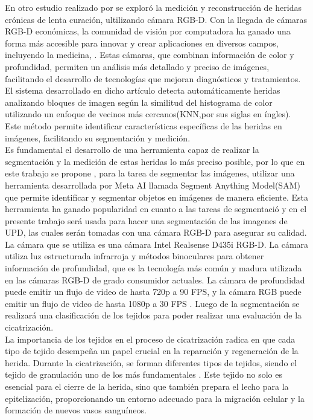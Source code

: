 \documentclass[12pt]{article}
\begin{document}
	En otro estudio realizado por \cite{Filko2018} se explor\'o la medici\'on y reconstrucci\'on de heridas cr\'onicas de lenta curaci\'on, ultilizando c\'amara RGB-D. Con la llegada de cámaras RGB-D económicas, la comunidad de visión por computadora ha ganado una forma más accesible para innovar y crear aplicaciones en diversos campos, incluyendo la medicina, \cite{Filko2018}. Estas cámaras, que combinan información de color y profundidad, permiten un análisis más detallado y preciso de imágenes, facilitando el desarrollo de tecnologías que mejoran diagnósticos y tratamientos. El sistema desarrollado en dicho art\'iculo detecta automáticamente heridas analizando bloques de imagen según la similitud del histograma de color utilizando un enfoque de vecinos más cercanos(KNN,por sus siglas en \'ingles). Este método permite identificar características específicas de las heridas en imágenes, facilitando su segmentación y medición.
	\\
	
	Es fundamental el desarrollo de una herramienta capaz de realizar la segmentaci\'on y la medici\'on de estas heridas lo m\'as preciso posible, por lo que en este trabajo se propone , para la tarea de segmentar las im\'agenes,  utilizar una herramienta desarrollada por Meta AI llamada Segment Anything Model(SAM)\parencite{segmentanything2023} que permite identificar y segmentar objetos en imágenes de manera eficiente. Esta herramienta ha ganado popularidad en cuanto a las tareas de segmentaci\'o y en el presente trabajo ser\'a usada para hacer una segmentaci\'on de las imagenes de UPD, las cuales ser\'an tomadas con una c\'amara RGB-D para asegurar su calidad.
	\\
	
	 La c\'amara que se utiliza es una c\'amara Intel Realsense D435i RGB-D. La cámara utiliza luz estructurada infrarroja y métodos binoculares para obtener información de profundidad, que es la tecnología más común y madura utilizada en las cámaras RGB-D de grado consumidor actuales. La cámara de profundidad puede emitir un flujo de video de hasta 720p a 90 FPS, y la cámara RGB puede emitir un flujo de video de hasta 1080p a 30 FPS \parencite{Zhang2023}. Luego de la segmentaci\'on se realizar\'a una clasificaci\'on de los tejidos para poder realizar una evaluaci\'on de la cicatrizaci\'on.
	 \\
	 
	La importancia de los tejidos en el proceso de cicatrización radica en que cada tipo de tejido desempeña un papel crucial en la reparación y regeneración de la herida. Durante la cicatrización, se forman diferentes tipos de tejidos, siendo el tejido de granulación uno de los más fundamentales \parencite{CUN2023}. Este tejido no solo es esencial para el cierre de la herida, sino que también prepara el lecho para la epitelización, proporcionando un entorno adecuado para la migración celular y la formación de nuevos vasos sanguíneos.
	
\end{document}
